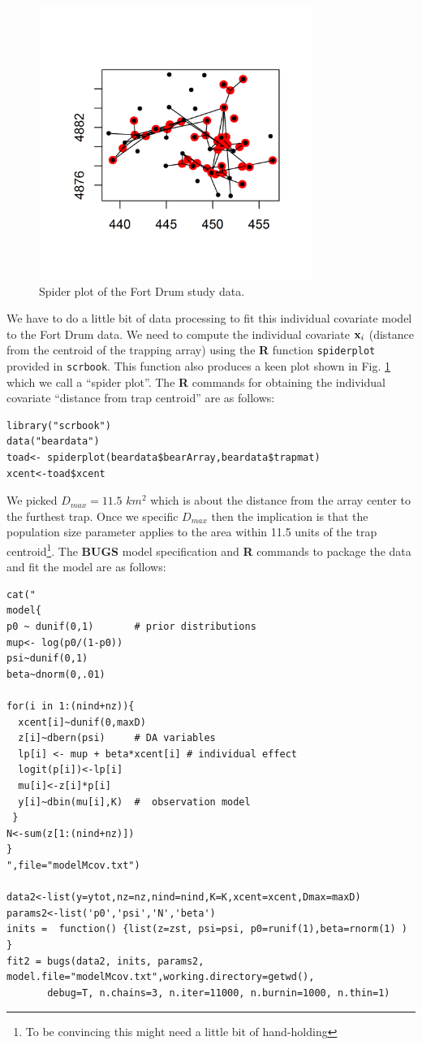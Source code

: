 \begin{figure}
\centering
\includegraphics[height=3.5in,width=3.5in]{Ch3/figs/bear_spiderplot.png}
\caption{Spider plot of the Fort Drum study data.}
\label{closed.fig.spiderplot}
\end{figure}


We have to do a little bit of data processing to fit this individual
covariate model to the Fort Drum data. 
We need to compute the individual covariate ${\bf x}_{i}$ (distance from the centroid of the trapping
array) using the {\bf R} function
\mbox{\tt spiderplot}
provided in \mbox{\tt scrbook}. This function also produces a keen plot shown in
Fig. \ref{closed.fig.spiderplot} which we call a ``spider plot''.
The {\bf R} commands for obtaining the individual covariate ``distance from trap centroid''
are as follows:
\begin{verbatim}
library("scrbook")
data("beardata")
toad<- spiderplot(beardata$bearArray,beardata$trapmat)
xcent<-toad$xcent
\end{verbatim}
We picked $D_{max} = 11.5$ $km^2$ which is about the distance from the
array center to the furthest trap. 
Once we specific $D_{max}$ then the implication is that the population
size parameter applies to the area 
within 11.5 units of the trap centroid\footnote{To be convincing
  this might  need a little bit of hand-holding}. The {\bf BUGS} model
specification and {\bf R} commands to package the data and fit the model are
as follows:

{\small
\begin{verbatim}
cat("
model{
p0 ~ dunif(0,1)       # prior distributions
mup<- log(p0/(1-p0))
psi~dunif(0,1)
beta~dnorm(0,.01)

for(i in 1:(nind+nz)){
  xcent[i]~dunif(0,maxD)
  z[i]~dbern(psi)     # DA variables
  lp[i] <- mup + beta*xcent[i] # individual effect
  logit(p[i])<-lp[i]
  mu[i]<-z[i]*p[i]
  y[i]~dbin(mu[i],K)  #  observation model
 }
N<-sum(z[1:(nind+nz)])
}
",file="modelMcov.txt")

data2<-list(y=ytot,nz=nz,nind=nind,K=K,xcent=xcent,Dmax=maxD)
params2<-list('p0','psi','N','beta')
inits =  function() {list(z=zst, psi=psi, p0=runif(1),beta=rnorm(1) ) }
fit2 = bugs(data2, inits, params2, model.file="modelMcov.txt",working.directory=getwd(),    
       debug=T, n.chains=3, n.iter=11000, n.burnin=1000, n.thin=1)
\end{verbatim}
}

